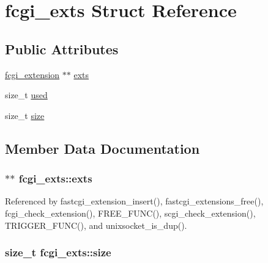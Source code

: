 \hypertarget{structfcgi__exts}{\section{fcgi\-\_\-exts Struct Reference}
\label{structfcgi__exts}
}
\subsection*{Public Attributes}
\begin{DoxyCompactItemize}
\item 
\hyperlink{structfcgi__extension}{fcgi\-\_\-extension} $\ast$$\ast$ \hyperlink{structfcgi__exts_aeedc96dbda7a3e7c6d183a68c5d6e44e}{exts}
\item 
size\-\_\-t \hyperlink{structfcgi__exts_a36b2a60d90e6c06887577925e8e839f4}{used}
\item 
size\-\_\-t \hyperlink{structfcgi__exts_afec42946ffec6a97af596730fd61343d}{size}
\end{DoxyCompactItemize}


\subsection{Member Data Documentation}
\hypertarget{structfcgi__exts_aeedc96dbda7a3e7c6d183a68c5d6e44e}{
\subsubsection[{exts}]{$\ast$$\ast$ fcgi\-\_\-exts\-::exts}}\label{structfcgi__exts_aeedc96dbda7a3e7c6d183a68c5d6e44e}


Referenced by fastcgi\-\_\-extension\-\_\-insert(), fastcgi\-\_\-extensions\-\_\-free(), fcgi\-\_\-check\-\_\-extension(), F\-R\-E\-E\-\_\-\-F\-U\-N\-C(), scgi\-\_\-check\-\_\-extension(), T\-R\-I\-G\-G\-E\-R\-\_\-\-F\-U\-N\-C(), and unixsocket\-\_\-is\-\_\-dup().

\hypertarget{structfcgi__exts_afec42946ffec6a97af596730fd61343d}{
\subsubsection[{size}]{\setlength{\rightskip}{0pt plus 5cm}size\-\_\-t fcgi\-\_\-exts\-::size}}\label{structfcgi__exts_afec42946ffec6a97af596730fd61343d}


